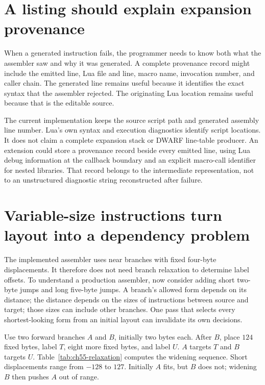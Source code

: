 \section{A listing should explain expansion provenance}
\label{sec:ch55-provenance}

When a generated instruction fails, the programmer needs to know both what the assembler saw and why it was generated.
A complete provenance record might include the emitted line, Lua file and line, macro name, invocation number, and caller chain.
The generated line remains useful because it identifies the exact syntax that the assembler rejected.
The originating Lua location remains useful because that is the editable source.

The current implementation keeps the source script path and generated assembly line number.
Lua's own syntax and execution diagnostics identify script locations.
It does not claim a complete expansion stack or DWARF line-table producer.
An extension could store a provenance record beside every emitted line, using Lua debug information at the callback boundary and an explicit macro-call identifier for nested libraries.
That record belongs to the intermediate representation, not to an unstructured diagnostic string reconstructed after failure.

\section{Variable-size instructions turn layout into a dependency problem}
\label{sec:ch55-relaxation}

The implemented assembler uses near branches with fixed four-byte displacements.
It therefore does not need branch relaxation to determine label offsets.
To understand a production assembler, now consider adding short two-byte jumps and long five-byte jumps.
A branch's allowed form depends on its distance; the distance depends on the sizes of instructions between source and target; those sizes can include other branches.
One pass that selects every shortest-looking form from an initial layout can invalidate its own decisions.

Use two forward branches $A$ and $B$, initially two bytes each.
After $B$, place $124$ fixed bytes, label $T$, eight more fixed bytes, and label $U$.
$A$ targets $T$ and $B$ targets $U$.
Table~\ref{tab:ch55-relaxation} computes the widening sequence.
Short displacements range from $-128$ to $127$.
Initially $A$ fits, but $B$ does not; widening $B$ then pushes $A$ out of range.

